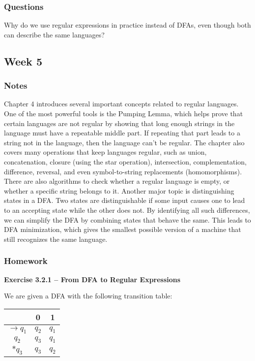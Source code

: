 \documentclass{article}
\theoremstyle{theorem}
\theoremstyle{definition}
\theoremstyle{remark}
\begin{document}
\subsubsection{Questions}

Why do we use regular expressions in practice instead of DFAs, even though both can describe the same languages?

\subsection{Week 5}

\subsubsection{Notes}

Chapter 4 introduces several important concepts related to regular languages. One of the most powerful tools is the Pumping Lemma, which helps prove that certain languages are not regular by showing that long enough strings in the language must have a repeatable middle part. If repeating that part leads to a string not in the language, then the language can't be regular. The chapter also covers many operations that keep languages regular, such as union, concatenation, closure (using the star operation), intersection, complementation, difference, reversal, and even symbol-to-string replacements (homomorphisms). There are also algorithms to check whether a regular language is empty, or whether a specific string belongs to it. Another major topic is distinguishing states in a DFA. Two states are distinguishable if some input causes one to lead to an accepting state while the other does not. By identifying all such differences, we can simplify the DFA by combining states that behave the same. This leads to DFA minimization, which gives the smallest possible version of a machine that still recognizes the same language.

\subsubsection{Homework}

\textbf{Exercise 3.2.1 – From DFA to Regular Expressions}

We are given a DFA with the following transition table:

\begin{center}
\begin{tabular}{c|cc}
      & 0   & 1   \\
\hline
$\rightarrow q_1$ & $q_2$ & $q_1$ \\
$q_2$             & $q_3$ & $q_1$ \\
$*q_3$            & $q_3$ & $q_2$ \\
\end{tabular}
\end{center}
\end{document}
